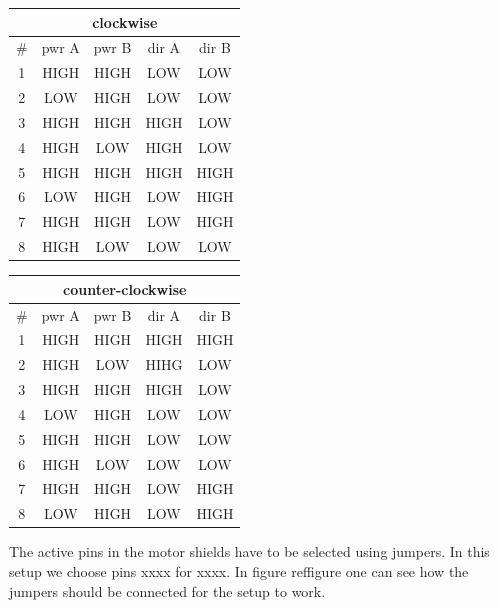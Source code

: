 \documentclass[a4paper,10pt]{article}
\begin{document}
\begin{table}[here]
\centering 
\begin{minipage}{0.4\textwidth}
  \begin{tabular}{ | c | c | c | c | c |}
    \hline
    \multicolumn{5}{|c|}{clockwise} \\ \hline
      \# & pwr A & pwr B & dir A & dir B \\ \hline
      1 & HIGH & HIGH & LOW & LOW \\ \hline
      2 & LOW & HIGH & LOW & LOW \\ \hline
      3 & HIGH & HIGH & HIGH & LOW \\ \hline
      4 & HIGH & LOW & HIGH & LOW \\ \hline
      5 & HIGH & HIGH & HIGH & HIGH \\ \hline
      6 & LOW & HIGH & LOW & HIGH \\ \hline
      7 & HIGH & HIGH & LOW & HIGH \\ \hline
      8 & HIGH & LOW & LOW & LOW \\
    \hline
  \end{tabular}
\end{minipage}
\hfill
\begin{minipage}{0.4\textwidth}
  \begin{tabular}{ |c | c | c | c | c |}
    \hline
    \multicolumn{5}{|c|}{counter-clockwise} \\ \hline
      \# & pwr A & pwr B & dir A & dir B \\ \hline
      1 & HIGH & HIGH & HIGH & HIGH \\ \hline
      2 & HIGH & LOW & HIHG & LOW \\ \hline
      3 & HIGH & HIGH & HIGH & LOW \\ \hline
      4 & LOW & HIGH & LOW & LOW \\ \hline
      5 & HIGH & HIGH & LOW & LOW \\ \hline
      6 & HIGH & LOW & LOW & LOW \\ \hline
      7 & HIGH & HIGH & LOW & HIGH \\ \hline
      8 & LOW & HIGH & LOW & HIGH \\
    \hline
  \end{tabular}
\end{minipage}

\end{table}


The active pins in the motor shields have to be selected using jumpers. In this setup we choose pins xxxx for xxxx. In figure ref{figure} one can see how the jumpers
should be connected for the setup to work.
\end{document}
